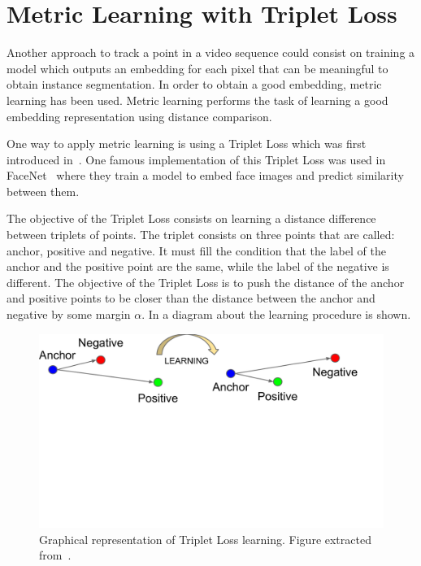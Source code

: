 \section{Metric Learning with Triplet Loss}
\label{sec:methods:metriclearning}

Another approach to track a point in a video sequence could consist on training a model which outputs an embedding for each pixel that can be meaningful to obtain instance segmentation.
In order to obtain a good embedding, metric learning has been used.
Metric learning performs the task of learning a good embedding representation using distance comparison.

One way to apply metric learning is using a Triplet Loss which was first introduced in~\metriclearning{}.
One famous implementation of this Triplet Loss was used in FaceNet~\facenet{} where they train a model to embed face images and predict similarity between them.

The objective of the Triplet Loss consists on learning a distance difference between triplets of points.
The triplet consists on three points that are called: anchor, positive and negative.
It must fill the condition that the label of the anchor and the positive point are the same, while the label of the negative is different.
The objective of the Triplet Loss is to push the distance of the anchor and positive points to be closer than the distance between the anchor and negative by some margin $\alpha$.
In  a diagram about the learning procedure is shown.

\begin{figure}[h]
  \centering
  \includegraphics[trim=1cm 9cm 2.5cm 0cm, clip, width=0.7\linewidth]{figures/methods/triplet_loss/triplet_viz.pdf}
  \caption{
    Graphical representation of Triplet Loss learning.
  Figure extracted from~\facenet{}. }
    \label{fig:tripletloss:visualization}
\end{figure}

